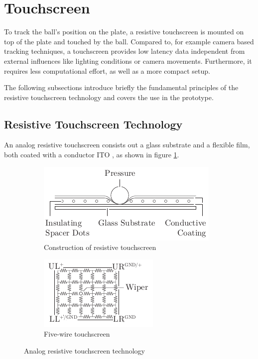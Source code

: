 \section{Touchscreen}
To track the ball's position on the plate, a resistive touchscreen is mounted
on top of the plate and touched by the ball. Compared to, for example camera
based tracking techniques, a touchscreen provides low latency data independent
from external influences like lighting conditions or camera movements.
Furthermore, it requires less computational effort, as well as a more compact
setup.

The following subsections introduce briefly the fundamental principles of the
resistive touchscreen technology and covers the use in the prototype.

\subsection{Resistive Touchscreen Technology}
An analog resistive touchscreen consists out a glass substrate and a flexible
film, both coated with a conductor \ac{ITO} \citep{Wal12}, as shown in figure
\ref{fig:touch_build}.
\begin{figure}
	\centering
	\begin{subfigure}{0.49\textwidth}
		\centering
		\includegraphics[width=\textwidth]{../figures/touch_build}
		\caption{Construction of resistive touchscreen}
		\label{fig:touch_build}
	\end{subfigure}
	\begin{subfigure}{0.49\textwidth}
		\centering
		\includegraphics[width=\textwidth]{../figures/touch_five}
		\caption{Five-wire touchscreen}
		\label{fig:touch_five}
	\end{subfigure}
	\caption{Analog resistive touchscreen technology}
	\label{fig:touch}
\end{figure}
